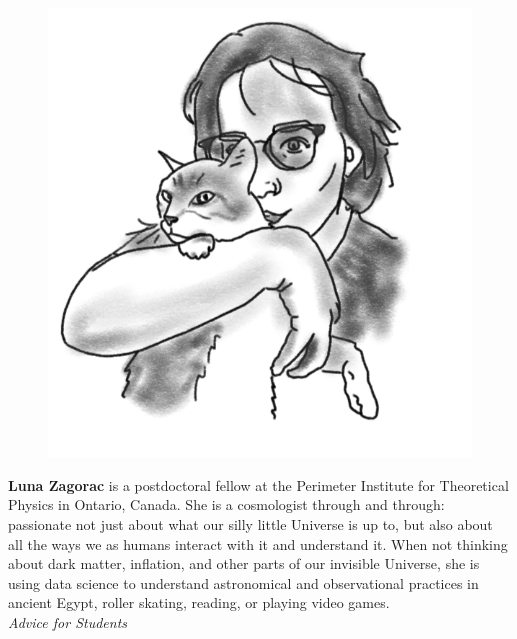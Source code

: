 \begin{figure}
\includegraphics[width=0.9\linewidth]{portraits/luna.png}
\end{figure}
\textbf{Luna Zagorac} is a postdoctoral fellow at the Perimeter Institute for Theoretical Physics in Ontario, Canada. She is a cosmologist through and through: passionate not just about what our silly little Universe is up to, but also about all the ways we as humans interact with it and understand it. When not thinking about dark matter, inflation, and other parts of our invisible Universe, she is using data science to understand astronomical and observational practices in ancient Egypt, roller skating, reading, or playing video games. \\

\pagebreak
\Large{\emph{Advice for Students}}\\
\vspace{-10pt}
\normalsize


